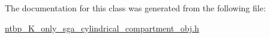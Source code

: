 The documentation for this class was generated from the following file:\begin{DoxyCompactItemize}
\item 
\hyperlink{ntbp___k__only__sga__cylindrical__compartment__obj_8h}{ntbp\_\-K\_\-only\_\-sga\_\-cylindrical\_\-compartment\_\-obj.h}\end{DoxyCompactItemize}
